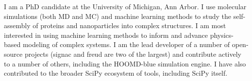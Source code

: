 \begin{cvparagraph}

    I am a PhD candidate at the University of Michigan, Ann Arbor. I use molecular simulations (both MD and MC) and machine learning methods to study the self-assembly of proteins and nanoparticles into complex structures. I am most interested in using machine learning methods to inform and advance physics-based modeling of complex systems. I am the lead developer of a number of open-source projects (signac and freud are two of the largest) and contribute actively to a number of others, including the HOOMD-blue simulation engine. I have also contributed to the broader SciPy ecosystem of tools, including SciPy itself.
\end{cvparagraph}
